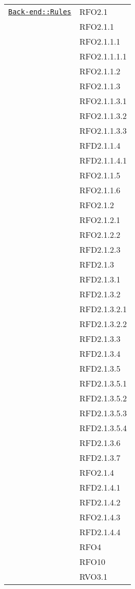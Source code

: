 \begin{longtable}{|>{\centering}m{10cm}|m{3cm}<{\centering}|}
\hyperref[Back-end::Rules]{\texttt{Back-end::Rules}} & RFO2.1\\
& RFO2.1.1\\
& RFO2.1.1.1\\
& RFO2.1.1.1.1\\
& RFO2.1.1.2\\
& RFO2.1.1.3\\
& RFO2.1.1.3.1\\
& RFO2.1.1.3.2\\
& RFO2.1.1.3.3\\
& RFD2.1.1.4\\
& RFD2.1.1.4.1\\
& RFO2.1.1.5\\
& RFO2.1.1.6\\
& RFO2.1.2\\
& RFO2.1.2.1\\
& RFO2.1.2.2\\
& RFD2.1.2.3\\
& RFD2.1.3\\
& RFD2.1.3.1\\
& RFD2.1.3.2\\
& RFD2.1.3.2.1\\
& RFD2.1.3.2.2\\
& RFD2.1.3.3\\
& RFD2.1.3.4\\
& RFD2.1.3.5\\
& RFD2.1.3.5.1\\
& RFD2.1.3.5.2\\
& RFD2.1.3.5.3\\
& RFD2.1.3.5.4\\
& RFD2.1.3.6\\
& RFD2.1.3.7\\
& RFO2.1.4\\
& RFD2.1.4.1\\
& RFD2.1.4.2\\
& RFO2.1.4.3\\
& RFD2.1.4.4\\
& RFO4\\
& RFO10\\
& RVO3.1\\ \hline


\end{longtable}
